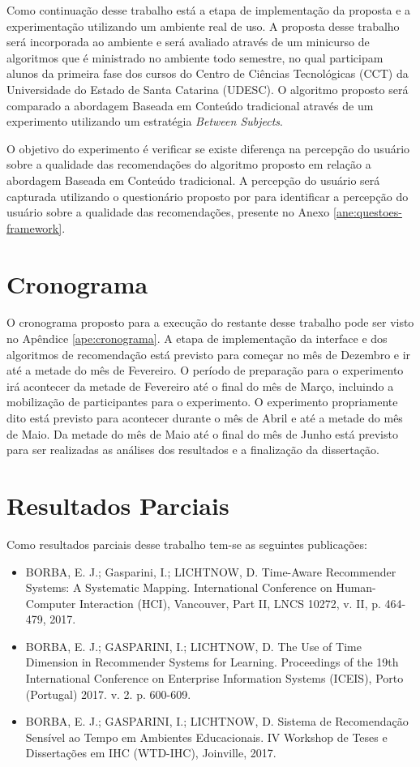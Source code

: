 Como continuação desse trabalho está a etapa de implementação da proposta e a experimentação utilizando um ambiente
real de uso. A proposta desse trabalho será incorporada ao ambiente \adaptweb e será avaliado através de um minicurso de
algoritmos que é ministrado no ambiente todo semestre, no qual participam alunos da primeira fase dos cursos
do Centro de Ciências Tecnológicas (CCT) da Universidade do Estado de Santa Catarina (UDESC). O algoritmo proposto será
comparado a abordagem Baseada em Conteúdo tradicional através de um experimento utilizando um estratégia \textit{Between Subjects}.

O objetivo do experimento é verificar se existe diferença na percepção do usuário sobre a qualidade das recomendações do
algoritmo proposto em relação a abordagem Baseada em Conteúdo tradicional. A percepção do usuário será capturada utilizando
o questionário proposto por  para identificar a percepção do usuário sobre a qualidade das recomendações,
presente no Anexo \ref{ane:questoes-framework}.

\section{Cronograma}

O cronograma proposto para a execução do restante desse trabalho pode ser visto no Apêndice \ref{ape:cronograma}. A etapa
de implementação da interface e dos algoritmos de recomendação está previsto para começar no mês de Dezembro e ir até
a metade do mês de Fevereiro. O período de preparação para o experimento irá acontecer da metade de Fevereiro até o
final do mês de Março, incluindo a mobilização de participantes para o experimento. O experimento propriamente dito está
previsto para acontecer durante o mês de Abril e até a metade do mês de Maio. Da metade do mês de Maio até o final do mês de Junho
está previsto para ser realizadas as análises dos resultados e a finalização da dissertação.

\section{Resultados Parciais}

Como resultados parciais desse trabalho tem-se as seguintes publicações:

\begin{itemize}
\item BORBA, E. J.; Gasparini, I.; LICHTNOW, D. Time-Aware Recommender Systems: A Systematic Mapping. International Conference on Human-Computer Interaction (HCI), Vancouver, Part II, LNCS 10272, v. II, p. 464-479, 2017.
\item BORBA, E. J.; GASPARINI, I.; LICHTNOW, D. The Use of Time Dimension in Recommender Systems for Learning. Proceedings of the 19th International Conference on Enterprise Information Systems (ICEIS), Porto (Portugal) 2017. v. 2. p. 600-609.
\item BORBA, E. J.; GASPARINI, I.; LICHTNOW, D. Sistema de Recomendação Sensível ao Tempo em Ambientes Educacionais. IV Workshop de Teses e Dissertações em IHC (WTD-IHC), Joinville, 2017.
\end{itemize}
